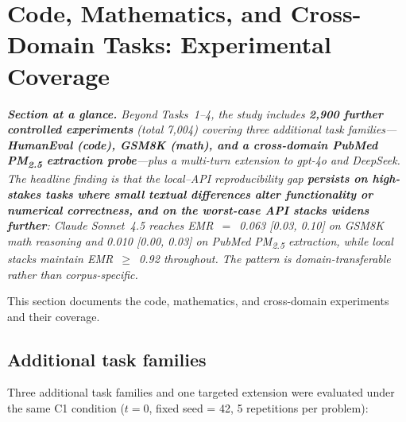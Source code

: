 \documentclass[11pt]{article}
\begin{document}
\section{Code, Mathematics, and Cross-Domain Tasks: Experimental Coverage}\label{sec:s11}

\textit{\textbf{Section at a glance.} Beyond Tasks~1--4, the study includes \textbf{2{,}900 further controlled experiments} (total 7{,}004) covering three additional task families---\textbf{HumanEval (code), GSM8K (math), and a cross-domain PubMed PM\textsubscript{2.5} extraction probe}---plus a multi-turn extension to gpt-4o and DeepSeek. The headline finding is that the local--API reproducibility gap \textbf{persists on high-stakes tasks where small textual differences alter functionality or numerical correctness, and on the worst-case API stacks widens further}: Claude Sonnet~4.5 reaches EMR~$=$~0.063 [0.03, 0.10] on GSM8K math reasoning and 0.010 [0.00, 0.03] on PubMed PM\textsubscript{2.5} extraction, while local stacks maintain EMR~$\geq$~0.92 throughout. The pattern is domain-transferable rather than corpus-specific.}

This section documents the code, mathematics, and cross-domain experiments and their coverage.

\subsection{Additional task families}

Three additional task families and one targeted extension were evaluated under the same C1 condition ($t{=}0$, fixed seed = 42, 5 repetitions per problem):
\end{document}
